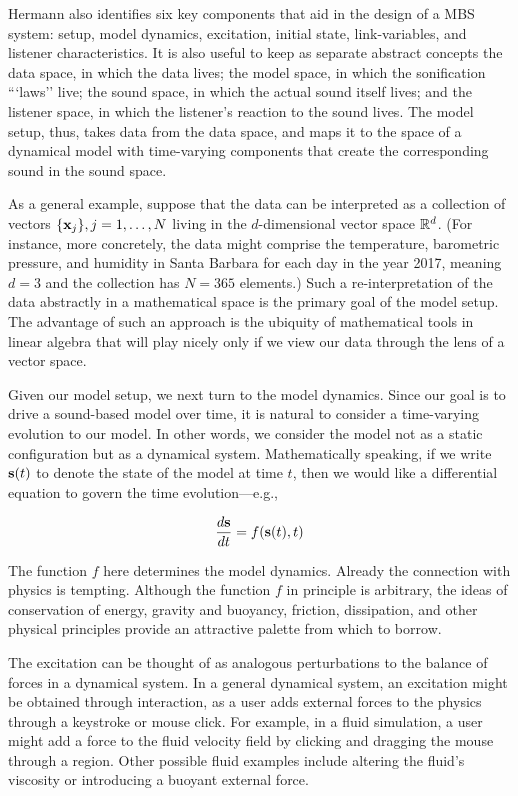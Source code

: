 Hermann also identifies six key components that aid in the design of a MBS system: setup, model dynamics, excitation, initial state, link-variables, and listener characteristics. It is also useful to keep as separate abstract concepts the data space, in which the data lives; the model space, in which the sonification ```laws'' live; the sound space, in which the actual sound itself lives; and the listener space, in which the listener's reaction to the sound lives. The model setup, thus, takes data from the data space, and maps it to the space of a dynamical model with time-varying components that create the corresponding sound in the sound space. 

As a general example, suppose that the data can be interpreted as a collection of vectors $\{\mathbf{x}_j\}, j=1,\dots,N$ living in the $d$-dimensional vector space $\mathbb{R}^d$. (For instance, more concretely, the data might comprise the temperature, barometric pressure, and humidity in Santa Barbara for each day in the year 2017, meaning $d=3$ and the collection has $N=365$ elements.) Such a re-interpretation of the data abstractly in a mathematical space is the primary goal of the model setup. The advantage of such an approach is the ubiquity of mathematical tools in linear algebra that will play nicely only if we view our data through the lens of a vector space.

Given our model setup, we next turn to the model dynamics. Since our goal is to drive a sound-based model over time, it is natural to consider a time-varying evolution to our model. In other words, we consider the model not as a static configuration but as a dynamical system. Mathematically speaking, if we write ${\mathbf{s}}(t)$ to denote the state of the model at time $t$, then we would like a differential equation to govern the time evolution---e.g.,

\begin{equation}
\frac{d{\mathbf{s}}}{dt} = f({\mathbf{s}}(t), t)
\end{equation}

The function $f$ here determines the model dynamics. Already the connection with physics is tempting. Although the function $f$ in principle is arbitrary, the ideas of conservation of energy, gravity and buoyancy, friction, dissipation, and other physical principles provide an attractive palette from which to borrow. 

The excitation can be thought of as analogous perturbations to the balance of forces in a dynamical system. In a general dynamical system, an excitation might be obtained through interaction, as a user adds external forces to the physics through a keystroke or mouse click. For example, in a fluid simulation, a user might add a force to the fluid velocity field by clicking and dragging the mouse through a region. Other possible fluid examples include altering the fluid's viscosity or introducing a buoyant external force. 

